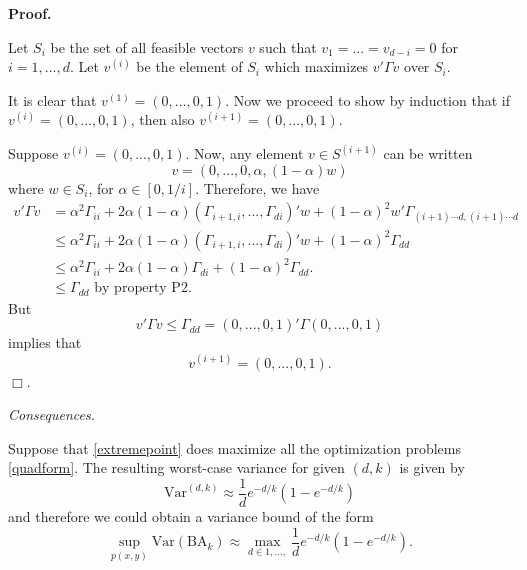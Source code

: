 \documentclass[12pt]{article}
\begin{document}
\noindent\textbf{Proof.}

Let $S_i$ be the set of all feasible vectors $v$ such that $v_1 =
... =v_{d-i} = 0$ for $i = 1,...,d$.  Let $v^{(i)}$ be the element of
$S_i$ which maximizes $v' \Gamma v$ over $S_i$.

It is clear that $v^{(1)} = (0,...,0, 1)$.  Now we proceed to show by
induction that if $v^{(i)} = (0,...,0,1)$, then also $v^{(i+1)} = (0,
...,0,1)$.

Suppose  $v^{(i)} = (0,...,0,1)$.  Now, any element $v \in S^{(i+1)}$ can be written
\[
v = (0, ..., 0, \alpha, (1-\alpha) w)
\]
where $w \in S_i$, for $\alpha \in [0,1/i]$.
Therefore, we have
\begin{align*}
v' \Gamma v &= \alpha^2 \Gamma_{ii} + 2 \alpha (1-\alpha) (\Gamma_{i+1, i},...,\Gamma_{di})' w + (1-\alpha)^2 w' \Gamma_{(i+1) \cdots d, (i+1) \cdots d}
\\&\leq \alpha^2 \Gamma_{ii} + 2 \alpha (1-\alpha) (\Gamma_{i+1, i},...,\Gamma_{di})' w + (1-\alpha)^2 \Gamma_{dd}
\\&\leq \alpha^2 \Gamma_{ii} + 2 \alpha (1-\alpha) \Gamma_{di} + (1-\alpha)^2 \Gamma_{dd}.
\\&\leq \Gamma_{dd}\text{ by property P2}.
\end{align*}
But
\[
v' \Gamma v \leq \Gamma_{dd} = (0,...,0,1)' \Gamma (0,...,0,1)
\]
implies that
\[
v^{(i+1)} = (0,...,0,1).
\]
$\Box$.

\emph{Consequences.}

Suppose that \eqref{extremepoint} does maximize all the optimization problems \eqref{quadform}.
The resulting worst-case variance for given $(d, k)$ is given by
\[
\text{Var}^{(d, k)} \approx \frac{1}{d}e^{-d/k}(1-e^{-d/k})
\]
and therefore we could obtain a variance bound of the form
\[
\sup_{p(x, y)}\text{Var}(\text{BA}_k) \approx \max_{d \in {1,...,}}  \frac{1}{d}e^{-d/k}(1-e^{-d/k}).
\]
\end{document}
